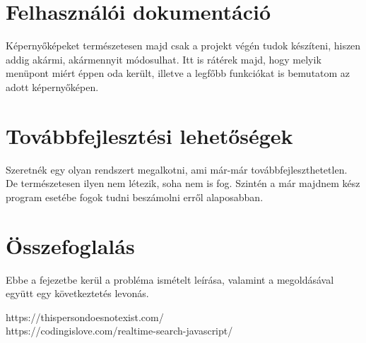 \documentclass[
]{thesis-ekf}
\begin{document}
\chapter{Felhasználói dokumentáció}
Képernyőképeket természetesen majd csak a projekt végén tudok készíteni, hiszen addig akármi, akármennyit módosulhat. Itt is rátérek majd, hogy melyik menüpont miért éppen oda került, illetve a legfőbb funkciókat is bemutatom az adott képernyőképen.
\chapter{Továbbfejlesztési lehetőségek}
Szeretnék egy olyan rendszert megalkotni, ami már-már továbbfejleszthetetlen. De természetesen ilyen nem létezik, soha nem is fog. Szintén a már majdnem kész program esetébe fogok tudni beszámolni erről alaposabban.
\chapter{Összefoglalás}
Ebbe a fejezetbe kerül a probléma ismételt leírása, valamint a megoldásával együtt egy következtetés levonás.
\begin{thebibliography}{}
	https://thispersondoesnotexist.com/ \\
	https://codingislove.com/realtime-search-javascript/
\end{thebibliography}
\end{document}
